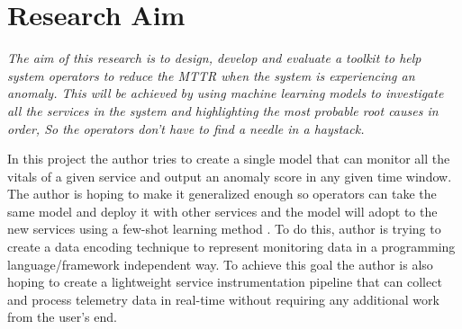 \section{Research Aim}

\textit{The aim of this research is to design, develop and evaluate a toolkit to help system operators to reduce the MTTR when the system is experiencing an anomaly. This will be achieved by using machine learning models to investigate all the services in the system and highlighting the most probable root causes in order, So the operators don’t have to find a needle in a haystack.}

In this project the author tries to create a single model that can monitor all the vitals of a given service and output an anomaly score in any given time window. The author is hoping to make it generalized enough so operators can take the same model and deploy it with other services and the model will adopt to the new services using a few-shot learning method \citep{wang2020generalizing}. To do this, author is trying to create a data encoding technique to represent monitoring data in a programming language/framework independent way. To achieve this goal the author is also hoping to create a lightweight service instrumentation pipeline that can collect and process telemetry data in real-time without requiring any additional work from the user's end.